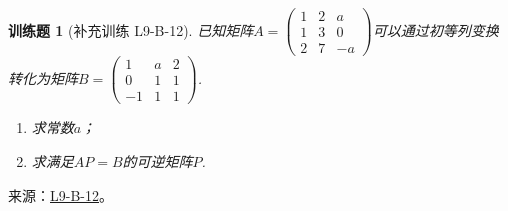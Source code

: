 \documentclass[UTF8,12pt,a4paper,fontset=fandol]{ctexart}
\newtheorem{exercise}{训练题}[section]
\begin{document}
\begin{exercise}[补充训练 L9-B-12]\label{prob:L9-B-12}
已知矩阵$A=\begin{pmatrix}1 & 2 & a  \\
            1 & 3 & 0  \\
            2 & 7 & -a\end{pmatrix}$可以通过初等列变换转化为矩阵$B=\begin{pmatrix}1  & a & 2 \\
            0  & 1 & 1 \\
            -1 & 1 & 1\end{pmatrix}$.
        \begin{enumerate}
            \item 求常数$a$；
            \item 求满足$AP=B$的可逆矩阵$P$.
        \end{enumerate}
\end{exercise}
\noindent 来源：\href{https://github.com/yhwu-is/Linear-Algebra-Left-Undone/blob/new/%E8%AE%B2%E4%B9%89/%E4%B8%93%E9%A2%98/9%20%E7%9F%A9%E9%98%B5%E8%BF%90%E7%AE%97%E8%BF%9B%E9%98%B6.tex}{L9-B-12}。
\end{document}
